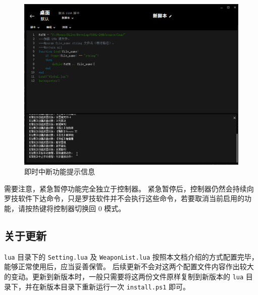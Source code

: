 \begin{figure}[H]
    \Centering
    \includegraphics[width=\textwidth]{docs/assets/interrupt.png}
    \caption{即时中断功能提示信息}
\end{figure}

需要注意，紧急暂停功能完全独立于控制器。
紧急暂停后，控制器仍然会持续向罗技软件下达命令，只是罗技软件并不会执行这些命令，若要取消当前启用的功能，请按热键将控制器切换回 0 模式。

\subsection{关于更新}

\lstinline{lua} 目录下的 \lstinline{Setting.lua} 及 \lstinline{WeaponList.lua} 按照本文档介绍的方式配置完毕，能够正常使用后，应当妥善保管。
后续更新不会对这两个配置文件内容作出较大的变动。更新到新版本时，一般只需要将这两份文件原样复制到新版本的 \lstinline{lua} 目录下，并在新版本目录下重新运行一次 \lstinline{install.ps1} 即可。